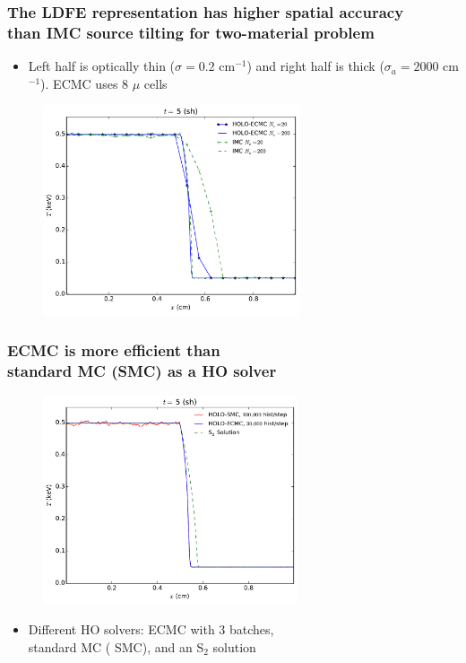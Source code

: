 \documentclass[xcolor=dvipsnames,hyperref={pdfpagelabels=false},unknownkeysallowed,
handout]{beamer}
\newcommand{\colb}[1]{{\color{blue} #1}}
\newcommand{\colG}[1]{{\color{Gray!110} #1}}
\newcommand{\colr}[1]{{\color{red} #1}}
\newlength{\wideitemsep}
\let\olditem\item
\renewcommand{\item}{\setlength{\itemsep}{\wideitemsep}\olditem}
\begin{document}
\begin{frame}
    \frametitle{The LDFE representation has higher spatial accuracy \\ than IMC source tilting for two-material problem}
        \fontsize{10.2pt}{10.2pt}\selectfont
        \vspace{0.2in} 
        \begin{itemize}
            \item[] Left half is optically thin ($\sigma\!=\!0.2$ cm$^{-1}$) and
                right half is thick ($\sigma_a\!=\!2000$ cm$^{-1}$). \colG{ECMC uses 8 $\mu$ cells}
        \end{itemize}
\begin{figure}
    \centering
    \includegraphics[width=0.6755799\textwidth]{two_mat_conv.pdf}
\end{figure}

\end{frame}

\begin{frame}
    \frametitle{ECMC is more efficient than\\
 standard MC (SMC) as a HO solver }
    \centering
    \begin{figure}
    \includegraphics[width=0.6699\textwidth]{two_mat_ho_compare.pdf}
    \centering
    \end{figure}
        {\small
    \begin{itemize}
        \item[] Different HO solvers: \colb{ECMC} with 3 batches, \\ standard MC (\colr{SMC}), and an S$_2$
            solution
    \end{itemize}
}
\end{frame}
\end{document}
